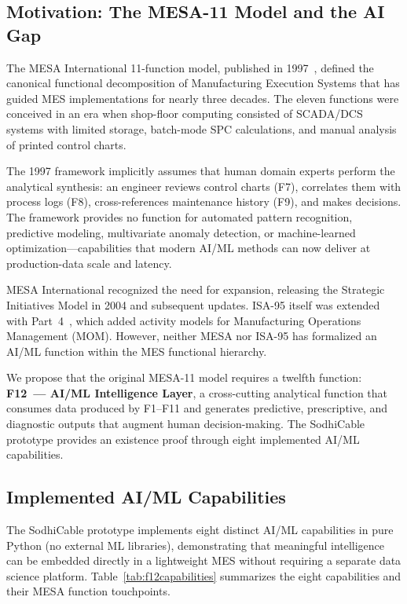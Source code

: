 \documentclass[11pt]{article}
\begin{document}
\subsection{Motivation: The MESA-11 Model and the AI Gap}

The MESA International 11-function model, published in 1997~\cite{mesa1997}, defined the canonical functional decomposition of Manufacturing Execution Systems that has guided MES implementations for nearly three decades.  The eleven functions were conceived in an era when shop-floor computing consisted of SCADA/DCS systems with limited storage, batch-mode SPC calculations, and manual analysis of printed control charts.

The 1997 framework implicitly assumes that human domain experts perform the analytical synthesis: an engineer reviews control charts (F7), correlates them with process logs (F8), cross-references maintenance history (F9), and makes decisions.  The framework provides no function for automated pattern recognition, predictive modeling, multivariate anomaly detection, or machine-learned optimization---capabilities that modern AI/ML methods can now deliver at production-data scale and latency.

MESA International recognized the need for expansion, releasing the Strategic Initiatives Model in 2004 and subsequent updates.  ISA-95 itself was extended with Part~4~\cite{isa95part4}, which added activity models for Manufacturing Operations Management (MOM).  However, neither MESA nor ISA-95 has formalized an AI/ML function within the MES functional hierarchy.

We propose that the original MESA-11 model requires a twelfth function: \textbf{F12~--- AI/ML Intelligence Layer}, a cross-cutting analytical function that consumes data produced by F1--F11 and generates predictive, prescriptive, and diagnostic outputs that augment human decision-making.  The SodhiCable prototype provides an existence proof through eight implemented AI/ML capabilities.


\subsection{Implemented AI/ML Capabilities}

The SodhiCable prototype implements eight distinct AI/ML capabilities in pure Python (no external ML libraries), demonstrating that meaningful intelligence can be embedded directly in a lightweight MES without requiring a separate data science platform.  Table~\ref{tab:f12capabilities} summarizes the eight capabilities and their MESA function touchpoints.
\end{document}
